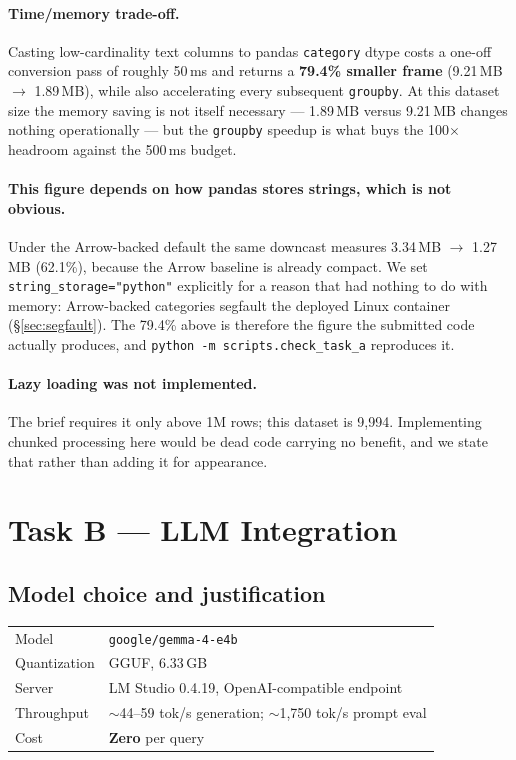 \documentclass[11pt,a4paper]{article}
\begin{document}
\paragraph{Time/memory trade-off.} Casting low-cardinality text columns to pandas
\texttt{category} dtype costs a one-off conversion pass of roughly 50\,ms and returns a
\textbf{79.4\% smaller frame} (9.21\,MB $\rightarrow$ 1.89\,MB), while also
accelerating every subsequent \texttt{groupby}. At this dataset size the memory saving
is not itself necessary --- 1.89\,MB versus 9.21\,MB changes nothing operationally ---
but the \texttt{groupby} speedup is what buys the 100$\times$ headroom against the
500\,ms budget.

\paragraph{This figure depends on how pandas stores strings, which is not obvious.}
Under the Arrow-backed default the same downcast measures 3.34\,MB $\rightarrow$
1.27\,MB (62.1\%), because the Arrow baseline is already compact. We set
\texttt{string\_storage="python"} explicitly for a reason that had nothing to do with
memory: Arrow-backed categories segfault the deployed Linux container
(\S\ref{sec:segfault}). The 79.4\% above is therefore the figure the submitted code
actually produces, and \texttt{python -m scripts.check\_task\_a} reproduces it.

\paragraph{Lazy loading was not implemented.} The brief requires it only above 1M rows;
this dataset is 9,994. Implementing chunked processing here would be dead code carrying
no benefit, and we state that rather than adding it for appearance.

\section{Task B --- LLM Integration}

\subsection{Model choice and justification}
\label{sec:model}

\begin{center}
\begin{tabular}{@{}ll@{}}
\toprule
Model        & \texttt{google/gemma-4-e4b} \\
Quantization & GGUF, 6.33\,GB \\
Server       & LM Studio 0.4.19, OpenAI-compatible endpoint \\
Throughput   & $\sim$44--59 tok/s generation; $\sim$1,750 tok/s prompt eval \\
Cost         & \textbf{Zero} per query \\
\bottomrule
\end{tabular}
\end{center}
\end{document}
